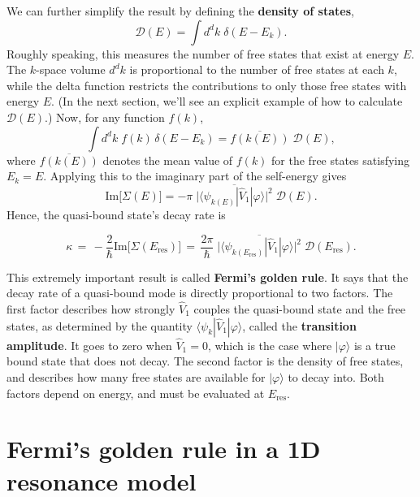 \documentclass[pra,12pt]{revtex4}
\begin{document}
We can further simplify the result by defining the \textbf{density of
  states},
\begin{equation}
  \mathcal{D}(E) = \int d^d k\; \delta(E - E_k).
\end{equation}
Roughly speaking, this measures the number of free states that exist
at energy $E$.  The $k$-space volume $d^dk$ is proportional to the
number of free states at each $k$, while the delta function restricts
the contributions to only those free states with energy $E$.  (In
the next section, we'll see an explicit example of how to calculate
$\mathcal{D}(E)$.)  Now, for any function $f(k)$,
\begin{equation}
  \int d^d k\; f(k) \, \delta(E - E_k) = \overline{f(k(E))} \;\mathcal{D}(E),
\end{equation}
where $\overline{f(k(E))}$ denotes the mean value of $f(k)$ for the
free states satisfying $E_k = E$.  Applying this to the imaginary part
of the self-energy gives
\begin{equation}
  \mathrm{Im}\big[\Sigma(E)\big] = - \pi \; \overline{\Big| \langle\psi_{k(E)}| \hat{V}_1|\varphi\rangle\Big|^2} \; \mathcal{D}(E).
\end{equation}
Hence, the quasi-bound state's decay rate is
\begin{framed}
  \begin{equation}
    \kappa \,=\, -\frac{2}{\hbar}\mathrm{Im}\big[\Sigma(E_{\mathrm{res}})\big] \,=\, \frac{2\pi}{\hbar} \; \overline{\Big| \langle\psi_{k(E_{\mathrm{res}})}| \hat{V}_1|\varphi\rangle\Big|^2} \; \mathcal{D}(E_{\mathrm{res}}).
  \end{equation}
\end{framed}
\vskip -0.15in
This extremely important result is called \textbf{Fermi's golden
  rule}.  It says that the decay rate of a quasi-bound mode is
directly proportional to two factors.  The first factor describes how
strongly $\hat{V}_1$ couples the quasi-bound state and the free
states, as determined by the quantity $\langle\psi_{k}|
\hat{V}_1|\varphi\rangle$, called the \textbf{transition amplitude}.
It goes to zero when $\hat{V}_1 = 0$, which is the case where
$|\varphi\rangle$ is a true bound state that does not decay.  The
second factor is the density of free states, and describes how many
free states are available for $|\varphi\rangle$ to decay into.  Both
factors depend on energy, and must be evaluated at $E_{\mathrm{res}}$.

\section{Fermi's golden rule in a 1D resonance model}
\end{document}

